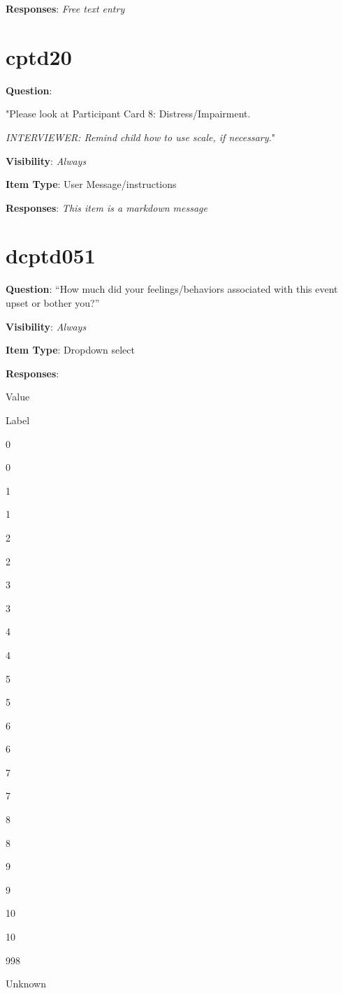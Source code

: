 \documentclass[]{book}
\begin{document}
\textbf{Responses}: \emph{Free text entry}

\hypertarget{cptd20}{%
\section{cptd20}\label{cptd20}}

\textbf{Question}:

"Please look at Participant Card 8: Distress/Impairment.

\emph{INTERVIEWER: Remind child how to use scale, if necessary.}"

\textbf{Visibility}: \emph{Always}

\textbf{Item Type}: User Message/instructions

\textbf{Responses}: \emph{This item is a markdown message}

\hypertarget{dcptd051}{%
\section{dcptd051}\label{dcptd051}}

\textbf{Question}: ``How much did your feelings/behaviors associated with this event upset or bother you?''

\textbf{Visibility}: \emph{Always}

\textbf{Item Type}: Dropdown select

\textbf{Responses}:

Value

Label

0

0

1

1

2

2

3

3

4

4

5

5

6

6

7

7

8

8

9

9

10

10

998

Unknown
\end{document}

